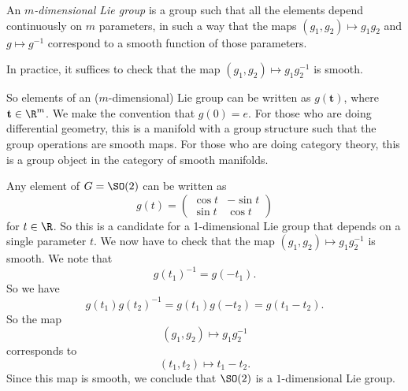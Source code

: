 \documentclass[a4paper]{article}
\begin{document}
\begin{defi}
  An \emph{$m$-dimensional Lie group} is a group such that all the elements depend continuously on $m$ parameters, in such a way that the maps $(g_1, g_2) \mapsto g_1 g_2$ and $g \mapsto g^{-1}$ correspond to a smooth function of those parameters.
\end{defi}
In practice, it suffices to check that the map $(g_1, g_2) \mapsto g_1 g_2^{-1}$ is smooth.

So elements of an ($m$-dimensional) Lie group can be written as $g(\mathbf{t})$, where $\mathbf{t} \in \R^m$. We make the convention that $g(0) = e$. For those who are doing differential geometry, this is a manifold with a group structure such that the group operations are smooth maps. For those who are doing category theory, this is a group object in the category of smooth manifolds.

\begin{eg}
  Any element of $G = \SO(2)$ can be written as
  \[
    g(t) =
    \begin{pmatrix}
      \cos t & -\sin t\\
      \sin t & \cos t
    \end{pmatrix}
  \]
  for $t \in \R$. So this is a candidate for a 1-dimensional Lie group that depends on a single parameter $t$. We now have to check that the map $(g_1, g_2) \mapsto g_1 g_2^{-1}$ is smooth. We note that
  \[
    g(t_1)^{-1} = g(-t_1).
  \]
  So we have
  \[
    g(t_1) g(t_2)^{-1} = g(t_1) g(-t_2) = g(t_1 - t_2).
  \]
  So the map
  \[
    (g_1, g_2) \mapsto g_1 g_2^{-1}
  \]
  corresponds to
  \[
    (t_1, t_2) \mapsto t_1 - t_2.
  \]
  Since this map is smooth, we conclude that $\SO(2)$ is a $1$-dimensional Lie group.
\end{eg}
\end{document}
